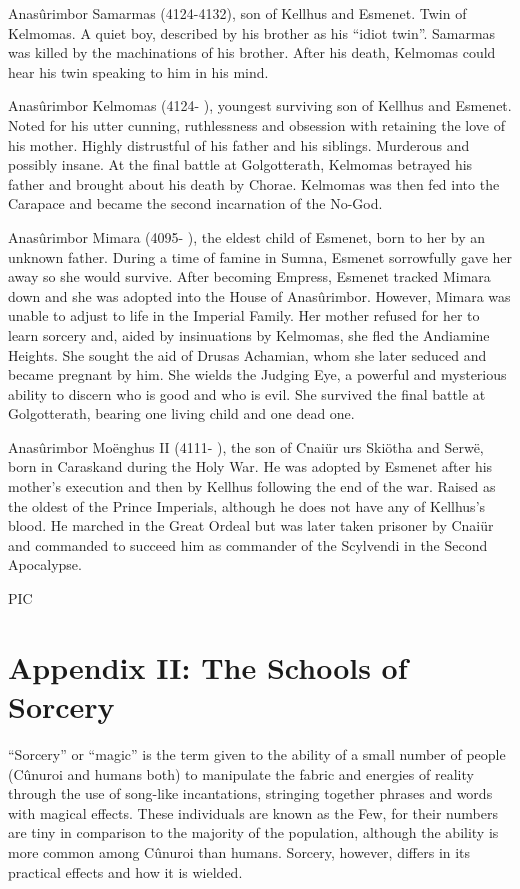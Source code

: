 \documentclass[]{book}
\begin{document}
Anasûrimbor Samarmas (4124-4132), son of Kellhus and Esmenet. Twin of
Kelmomas. A quiet boy, described by his brother as his ``idiot twin''. Samarmas
was killed by the machinations of his brother. After his death, Kelmomas could
hear his twin speaking to him in his mind.

Anasûrimbor Kelmomas (4124- ), youngest surviving son of Kellhus and Esmenet.
Noted for his utter cunning, ruthlessness and obsession with retaining the love
of his mother. Highly distrustful of his father and his siblings. Murderous and
possibly insane. At the final battle at Golgotterath, Kelmomas betrayed his
father and brought about his death by Chorae. Kelmomas was then fed into the
Carapace and became the second incarnation of the No-God.

Anasûrimbor Mimara (4095- ), the eldest child of Esmenet, born to her by an
unknown father. During a time of famine in Sumna, Esmenet sorrowfully gave
her away so she would survive. After becoming Empress, Esmenet tracked
Mimara down and she was adopted into the House of Anasûrimbor. However,
Mimara was unable to adjust to life in the Imperial Family. Her mother refused
for her to learn sorcery and, aided by insinuations by Kelmomas, she fled the
Andiamine Heights. She sought the aid of Drusas Achamian, whom she later
seduced and became pregnant by him. She wields the Judging Eye, a powerful
and mysterious ability to discern who is good and who is evil. She survived the
final battle at Golgotterath, bearing one living child and one dead one.

Anasûrimbor Moënghus II (4111- ), the son of Cnaiür urs Skiötha and Serwë, born
in Caraskand during the Holy War. He was adopted by Esmenet after his
mother's execution and then by Kellhus following the end of the war. Raised as
the oldest of the Prince Imperials, although he does not have any of Kellhus's
blood. He marched in the Great Ordeal but was later taken prisoner by Cnaiür
and commanded to succeed him as commander of the Scylvendi in the Second
Apocalypse.

PIC

\hypertarget{appendix-ii-the-schools-of-sorcery}{%
\section{Appendix II: The Schools of Sorcery}\label{appendix-ii-the-schools-of-sorcery}}

``Sorcery'' or ``magic'' is the term given to the ability of a small number of people
(Cûnuroi and humans both) to manipulate the fabric and energies of reality through
the use of song-like incantations, stringing together phrases and words with magical
effects. These individuals are known as the Few, for their numbers are tiny in
comparison to the majority of the population, although the ability is more common
among Cûnuroi than humans. Sorcery, however, differs in its practical effects and how
it is wielded.
\end{document}
